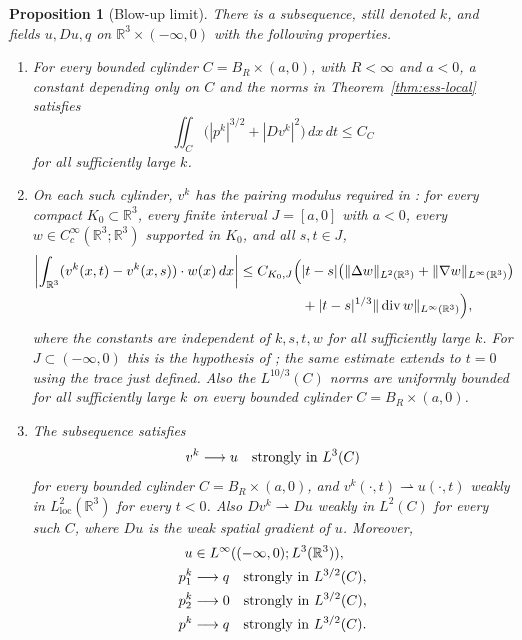 \documentclass[11pt,letterpaper]{article}
\numberwithin{equation}{section}
\theoremstyle{plain}
\newtheorem{proposition}[theorem]{Proposition}
\theoremstyle{definition}
\theoremstyle{remark}
\begin{document}
\begin{proposition}[Blow-up limit]
There is a subsequence, still denoted \(k\), and fields \(u,Du,q\) on \(\mathbb R^3\times(-\infty,0)\) with the following properties.
\begin{enumerate}[label=(\alph*)]
\item For every bounded cylinder \(C=B_R\times(a,0)\), with \(R<\infty\) and \(a<0\), a constant depending only on \(C\) and the norms in Theorem~\ref{thm:ess-local} satisfies
\begin{equation*}
 \iint_C\bigl(|p^k|^{3/2}+|Dv^k|^2\bigr)\,dx\,dt\le C_C
\end{equation*}
for all sufficiently large \(k\).

\item On each such cylinder, \(v^k\) has the pairing modulus required in \cite[Lemma~11.1]{CKNLean}: for every compact \(K_0\subset\mathbb R^3\), every finite interval \(J=[a,0]\) with \(a<0\), every \(w\in C_c^\infty(\mathbb R^3;\mathbb R^3)\) supported in \(K_0\), and all \(s,t\in J\),
\begin{align*}
\left|\int_{\mathbb R^3}(v^k(x,t)-v^k(x,s))\cdot w(x)\,dx\right|
\le C_{K_0,J}\Bigl(&|t-s|\bigl(\|\Delta w\|_{L^2(\mathbb R^3)}
                  +\|\nabla w\|_{L^\infty(\mathbb R^3)}\bigr)\\
 &+|t-s|^{1/3}\|\operatorname{div}w\|_{L^\infty(\mathbb R^3)}\Bigr),
\end{align*}
where the constants are independent of \(k,s,t,w\) for all sufficiently large \(k\). For \(J\subset(-\infty,0)\) this is the hypothesis of \cite[Lemma~11.1]{CKNLean}; the same estimate extends to \(t=0\) using the trace just defined. Also the \(L^{10/3}(C)\) norms are uniformly bounded for all sufficiently large \(k\) on every bounded cylinder \(C=B_R\times(a,0)\).

\item The subsequence satisfies
\begin{equation*}
 v^k\longrightarrow u\quad\hbox{strongly in }L^3(C)
\end{equation*}
for every bounded cylinder \(C=B_R\times(a,0)\), and \(v^k(\cdot,t)\rightharpoonup u(\cdot,t)\) weakly in \(L^2_{\mathrm{loc}}(\mathbb R^3)\) for every \(t<0\). Also \(Dv^k\rightharpoonup Du\) weakly in \(L^2(C)\) for every such \(C\), where \(Du\) is the weak spatial gradient of \(u\). Moreover,
\begin{align*}
 u&\in L^\infty((-\infty,0);L^3(\mathbb R^3)),\\
 p_1^k&\longrightarrow q\quad\hbox{strongly in }L^{3/2}(C),\\
 p_2^k&\longrightarrow0\quad\hbox{strongly in }L^{3/2}(C),\\
 p^k&\longrightarrow q\quad\hbox{strongly in }L^{3/2}(C).
\end{align*}


\end{enumerate}
\end{proposition}
\end{document}
